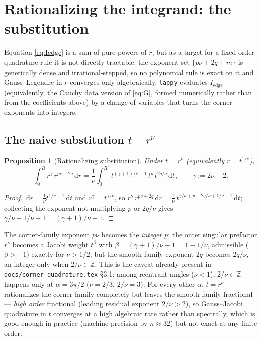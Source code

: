 \documentclass[11pt]{article}
\newtheorem{proposition}{Proposition}
\theoremstyle{remark}
\newcommand{\dd}{\,\mathrm{d}}
\newcommand{\code}[1]{\texttt{#1}}
\begin{document}
\section{Rationalizing the integrand: the substitution}\label{sec:sub}

Equation \eqref{eq:Iedge} is a sum of pure powers of $r$, but as a target for a fixed-order
quadrature rule it is not directly tractable: the exponent set $\{p\nu+2q+m\}$ is generically
dense and irrational-stepped, so no polynomial rule is exact on it and Gauss--Legendre in $r$
converges only algebraically. \code{lappy} evaluates $I_{\mathrm{edge}}$ (equivalently, the
Cauchy data version of \eqref{eq:G}, formed numerically rather than from the coefficients above)
by a change of variables that turns the corner exponents into integers.

\subsection{The naive substitution $t=r^\nu$}\label{sec:sub1}

\begin{proposition}[Rationalizing substitution]\label{prop:sub}
Under $t=r^\nu$ (equivalently $r=t^{1/\nu}$),
\begin{equation}\label{eq:sub}
  \int_0^R r^{\gamma}\,r^{p\nu+2q}\dd r
  = \frac1\nu\int_0^{R^\nu} t^{(\gamma+1)/\nu - 1}\, t^{p}\, t^{2q/\nu}\dd t,
  \qquad \gamma := 2\nu-2.
\end{equation}
\end{proposition}
\begin{proof}
$\dd r = \frac1\nu t^{1/\nu-1}\dd t$ and $r^\gamma = t^{\gamma/\nu}$, so
$r^\gamma\,r^{p\nu+2q}\dd r = \frac1\nu\, t^{\gamma/\nu + p + 2q/\nu + 1/\nu - 1}\dd t$; collecting
the exponent not multiplying $p$ or $2q/\nu$ gives $\gamma/\nu+1/\nu-1 = (\gamma+1)/\nu-1$.
\end{proof}
The corner-family exponent $p\nu$ becomes the \emph{integer} $p$; the outer singular prefactor
$r^\gamma$ becomes a Jacobi weight $t^{\beta}$ with $\beta=(\gamma+1)/\nu-1=1-1/\nu$, admissible
($\beta>-1$) exactly for $\nu>1/2$; but the smooth-family exponent $2q$ becomes $2q/\nu$, an
integer only when $2/\nu\in\mathbb Z$. This is the caveat already present in
\code{docs/corner\_quadrature.tex} \S3.1: among reentrant angles ($\nu<1$), $2/\nu\in\mathbb Z$
happens only at $\alpha=3\pi/2$ ($\nu=2/3$, $2/\nu=3$). For every other $\alpha$, $t=r^\nu$
rationalizes the corner family completely but leaves the smooth family fractional --- \emph{high
order} fractional (leading residual exponent $2/\nu>2$), so Gauss--Jacobi quadrature in $t$
converges at a high algebraic rate rather than spectrally, which is good enough in practice
(machine precision by $n\approx32$) but not exact at any finite order.
\end{document}
